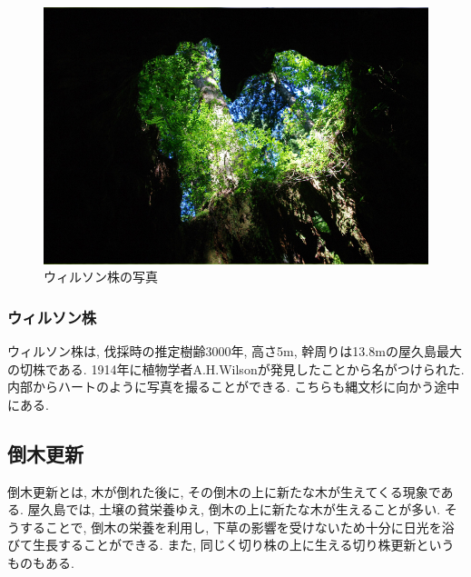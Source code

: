 \documentclass[10pt,titlepage,a5paper]{ltjsbook}
\begin{document}
  \begin{minipage}{0.38\columnwidth}
    \begin{figure}[H]
          \centering
          \includegraphics[width=\columnwidth]{willson.jpg}
          \caption{ウィルソン株の写真}
          \label{fig:willson_photo}
      \end{figure}
  \end{minipage}
  \hfill
  \begin{minipage}{0.58\columnwidth}
    \subsubsection*{ウィルソン株}
      ウィルソン株は, 伐採時の推定樹齢3000年, 高さ5m, 幹周りは13.8mの屋久島最大の切株である. 1914年に植物学者A.H.Wilsonが発見したことから名がつけられた. 内部からハートのように写真を撮ることができる. こちらも縄文杉に向かう途中にある.
  \end{minipage}
  \subsection{倒木更新}
    倒木更新とは, 木が倒れた後に, その倒木の上に新たな木が生えてくる現象である. 屋久島では, 土壌の貧栄養ゆえ, 倒木の上に新たな木が生えることが多い. そうすることで, 倒木の栄養を利用し, 下草の影響を受けないため十分に日光を浴びて生長することができる. また, 同じく切り株の上に生える切り株更新というものもある.
\end{document}
